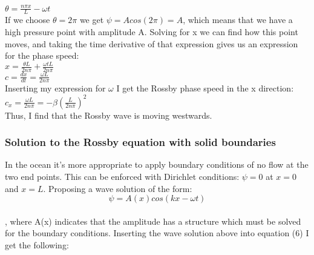 $\theta = \frac{n\pi x}{L}-\omega t$\\

If we choose $\theta = 2\pi$ we get $\psi = Acos(2\pi) = A$, which means that we have a high pressure point with amplitude A. Solving for x we can find how this point moves, and taking the time derivative of that expression gives us an expression for the phase speed:\\

$x = \frac{\theta L}{2n\pi} + \frac{\omega tL}{2n\pi}$\\

$c = \frac{dx}{dt} = \frac{\omega L}{2n\pi}$\\

Inserting my expression for $\omega$ I get the Rossby phase speed in the x direction:\\

$c_x = \frac{\omega L}{2n\pi} = -\beta(\frac{L}{2n\pi})^2$\\

Thus, I find that the Rossby wave is moving westwards.\\

\subsubsection{Solution to the Rossby equation with solid boundaries} 

In the ocean it's more appropriate to apply boundary conditions of no flow at the two end points. This can be enforced with Dirichlet conditions: $\psi = 0$ at $x=0$ and $x=L$. Proposing a wave solution of the form:\\

\begin{equation}
\psi = A(x)cos(kx-\omega t)
\end{equation}\\

, where A(x) indicates that the amplitude has a structure which must be solved for the boundary conditions. Inserting the wave solution above into equation (6) I get the following:\\

